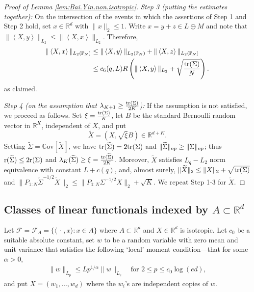 \documentclass[11pt]{amsart}
\newcommand{\R}{\mathbb{R}}
\newcommand{\inr}[1]{\left\langle #1 \right\rangle}
\theoremstyle{definition}
\renewcommand{\P}{\mathbb{P}}
\newcommand{\C}{\mathrm{\mathbb{C}ov}}
\renewcommand{\tilde}{\widetilde}
\numberwithin{equation}{section}
\begin{document}
\begin{proof}[Proof of Lemma \ref{lem:Bai.Yin.non.isotropic}]
 


\vspace{0.5em}
\noindent
\emph{Step 3 (putting the estimates together):}
On the intersection of the events in which the assertions of Step 1 and Step 2 hold, set $x\in\R^d$ with $\|x\|_2\leq 1$.
Write $x=y+z\in L\oplus M$ and note that $\|\inr{X,y}\|_{L_2}\leq \|\inr{X,x}\|_{L_2}$.
Therefore, 
\begin{align*}
 \|\inr{X,x}\|_{L_2(\P_N)}
&\leq \|\inr{X,y}\|_{L_2(\P_N)}  + \|\inr{X,z}\|_{L_2(\P_N)}
\\
&\leq c_6(q,L)R \left(  \|\inr{X,y}\|_{L_2} + \sqrt{\frac{{\rm tr}(\Sigma)}{N}} \right) .
\end{align*}
as claimed.



\vspace{0.5em}
\noindent
\emph{Step 4 (on the assumption that $\lambda_{K+1} \geq \frac{{\rm tr}(\Sigma) }{2K}$):}
If  the assumption is not satisfied, we proceed as follows.
Set $\xi= \frac{{\rm tr}(\Sigma) }{K}$, let $B$ be the standard Bernoulli random vector in $\R^{K}$, independent of $X$, and put  \[\tilde X = (X,\sqrt \xi B)\in\R^{d+K}.\]
Setting  $\tilde \Sigma=\C[\tilde X]$, we have ${\rm tr}(\tilde \Sigma) = 2 {\rm tr}(\Sigma)$ and $\|\tilde \Sigma\|_{\rm op} \geq \|\Sigma\|_{\rm op}$;  thus   ${\rm r}(\tilde \Sigma)\leq 2 {\rm r}(\Sigma)$ and  $\lambda_K(\tilde \Sigma)\geq \xi = \frac{{\rm tr}(\tilde \Sigma)}{2K}$.
Moreover,  $\tilde  X$ satisfies $L_{q}-L_{2}$ norm equivalence with constant $L+c(q)$, and, almost surely, $\|\tilde  X\|_{2}\leq \|X\|_2 + \sqrt{{\rm tr}(\Sigma)}$ and $\|P_{1:N} \tilde \Sigma^{{-1/2}} \tilde  X\|_{2} \leq \|P_{1:N}\Sigma^{{-1/2}} X \|_2 + \sqrt{K}$.
We repeat Step 1-3 for $\tilde X$.
\end{proof}



\subsection{Classes of linear functionals indexed by $A\subset \R^{d}$}

Let  $\mathcal{F}=\mathcal{F}_{A} =  \{ \langle \,\cdot \,, x\rangle : x\in A\}$ where $A\subset \R^d$ and $X\in\R^{d}$ is isotropic. 
Let   $c_{0}$ be a suitable absolute constant, set $w$ to be a random variable with zero mean and unit variance that satisfies the following `local' moment condition---that for some $\alpha>0$,
\begin{align}
\label{eq:local.psi.alpha}
 \|w\|_{L_p} \leq L p^{1/\alpha} \|w\|_{L_{2}} \quad\text{for }  2\leq p \leq c_{0}\log(ed),
\end{align}
and put  $X=(w_{1},\dots,w_{d})$ where the $w_{i}$'s are independent copies of $w$.
\end{document}
